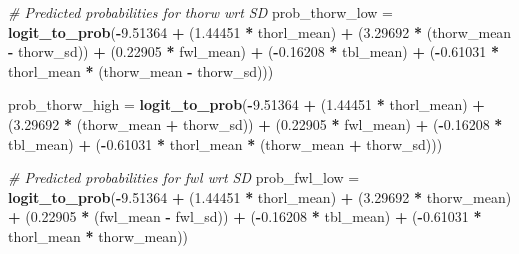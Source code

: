 \documentclass[
]{article}
\newenvironment{Shaded}{\begin{snugshade}}{\end{snugshade}}
\newcommand{\CommentTok}[1]{\textcolor[rgb]{0.56,0.35,0.01}{\textit{#1}}}
\newcommand{\FloatTok}[1]{\textcolor[rgb]{0.00,0.00,0.81}{#1}}
\newcommand{\FunctionTok}[1]{\textcolor[rgb]{0.13,0.29,0.53}{\textbf{#1}}}
\newcommand{\NormalTok}[1]{#1}
\newcommand{\OtherTok}[1]{\textcolor[rgb]{0.56,0.35,0.01}{#1}}
\newcommand{\SpecialCharTok}[1]{\textcolor[rgb]{0.81,0.36,0.00}{\textbf{#1}}}
\begin{document}
\begin{Shaded}
\begin{Highlighting}[]
\CommentTok{\# Predicted probabilities for thorw wrt SD}
\NormalTok{prob\_thorw\_low }\OtherTok{=} \FunctionTok{logit\_to\_prob}\NormalTok{(}\SpecialCharTok{{-}}\FloatTok{9.51364} \SpecialCharTok{+} 
\NormalTok{                                (}\FloatTok{1.44451} \SpecialCharTok{*}\NormalTok{ thorl\_mean) }\SpecialCharTok{+} 
\NormalTok{                                (}\FloatTok{3.29692} \SpecialCharTok{*}\NormalTok{ (thorw\_mean }\SpecialCharTok{{-}}\NormalTok{ thorw\_sd)) }\SpecialCharTok{+} 
\NormalTok{                                (}\FloatTok{0.22905} \SpecialCharTok{*}\NormalTok{ fwl\_mean) }\SpecialCharTok{+} 
\NormalTok{                                (}\SpecialCharTok{{-}}\FloatTok{0.16208} \SpecialCharTok{*}\NormalTok{ tbl\_mean) }\SpecialCharTok{+} 
\NormalTok{                                (}\SpecialCharTok{{-}}\FloatTok{0.61031} \SpecialCharTok{*}\NormalTok{ thorl\_mean }\SpecialCharTok{*}\NormalTok{ (thorw\_mean }\SpecialCharTok{{-}}\NormalTok{ thorw\_sd)))}

\NormalTok{prob\_thorw\_high }\OtherTok{=} \FunctionTok{logit\_to\_prob}\NormalTok{(}\SpecialCharTok{{-}}\FloatTok{9.51364} \SpecialCharTok{+} 
\NormalTok{                                 (}\FloatTok{1.44451} \SpecialCharTok{*}\NormalTok{ thorl\_mean) }\SpecialCharTok{+} 
\NormalTok{                                 (}\FloatTok{3.29692} \SpecialCharTok{*}\NormalTok{ (thorw\_mean }\SpecialCharTok{+}\NormalTok{ thorw\_sd)) }\SpecialCharTok{+} 
\NormalTok{                                 (}\FloatTok{0.22905} \SpecialCharTok{*}\NormalTok{ fwl\_mean) }\SpecialCharTok{+} 
\NormalTok{                                 (}\SpecialCharTok{{-}}\FloatTok{0.16208} \SpecialCharTok{*}\NormalTok{ tbl\_mean) }\SpecialCharTok{+} 
\NormalTok{                                 (}\SpecialCharTok{{-}}\FloatTok{0.61031} \SpecialCharTok{*}\NormalTok{ thorl\_mean }\SpecialCharTok{*}\NormalTok{ (thorw\_mean }\SpecialCharTok{+}\NormalTok{ thorw\_sd)))}

\CommentTok{\# Predicted probabilities for fwl wrt SD}
\NormalTok{prob\_fwl\_low }\OtherTok{=} \FunctionTok{logit\_to\_prob}\NormalTok{(}\SpecialCharTok{{-}}\FloatTok{9.51364} \SpecialCharTok{+} 
\NormalTok{                                (}\FloatTok{1.44451} \SpecialCharTok{*}\NormalTok{ thorl\_mean) }\SpecialCharTok{+} 
\NormalTok{                                (}\FloatTok{3.29692} \SpecialCharTok{*}\NormalTok{ thorw\_mean) }\SpecialCharTok{+} 
\NormalTok{                                (}\FloatTok{0.22905} \SpecialCharTok{*}\NormalTok{ (fwl\_mean }\SpecialCharTok{{-}}\NormalTok{ fwl\_sd)) }\SpecialCharTok{+} 
\NormalTok{                                (}\SpecialCharTok{{-}}\FloatTok{0.16208} \SpecialCharTok{*}\NormalTok{ tbl\_mean) }\SpecialCharTok{+} 
\NormalTok{                                (}\SpecialCharTok{{-}}\FloatTok{0.61031} \SpecialCharTok{*}\NormalTok{ thorl\_mean }\SpecialCharTok{*}\NormalTok{ thorw\_mean))}


\end{Highlighting}
\end{Shaded}
\end{document}
